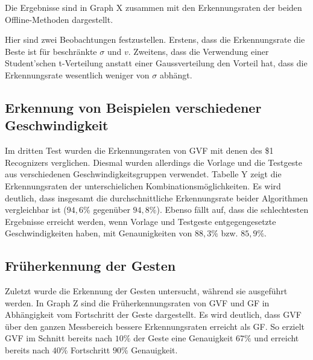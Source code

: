 \documentclass{llncs}
\begin{document}
Die Ergebnisse sind in Graph X zusammen mit den Erkennungsraten der beiden Offline-Methoden dargestellt.

Hier sind zwei Beobachtungen festzustellen. Erstens, dass die Erkennungsrate die Beste ist für beschränkte $\sigma$ und $v$. Zweitens, dass die Verwendung einer Student'schen t-Verteilung anstatt einer Gaussverteilung den Vorteil hat, dass die Erkennungsrate wesentlich weniger von $\sigma$ abhängt.

\subsection{Erkennung von Beispielen verschiedener Geschwindigkeit}
Im dritten Test wurden die Erkennungsraten von GVF mit denen des \$1 Recognizers verglichen. Diesmal wurden allerdings die Vorlage und die Testgeste aus verschiedenen Geschwindigkeitsgruppen verwendet. Tabelle Y zeigt die Erkennungsraten der unterschielichen Kombinationsmöglichkeiten. Es wird deutlich, dass insgesamt die durchschnittliche Erkennungsrate beider Algorithmen vergleichbar ist ($94,6\%$ gegenüber $94,8\%$). Ebenso fällt auf, dass die schlechtesten Ergebnisse erreicht werden, wenn Vorlage und Testgeste  entgegengesetzte Geschwindigkeiten haben, mit Genaunigkeiten von $88,3\%$ bzw. $85,9\%$.

\subsection{Früherkennung der Gesten}
Zuletzt wurde die Erkennung der Gesten untersucht, während sie ausgeführt werden. In Graph Z sind die Früherkennungsraten von GVF und GF in Abhängigkeit vom Fortschritt der Geste dargestellt. Es wird deutlich, dass GVF über den ganzen Messbereich bessere Erkennungsraten erreicht als GF. So erzielt GVF im Schnitt bereits nach $10\%$ der Geste eine Genauigkeit $67\%$ und erreicht bereits nach $40\%$ Fortschritt $90\%$ Genauigkeit.

  


\end{document}
